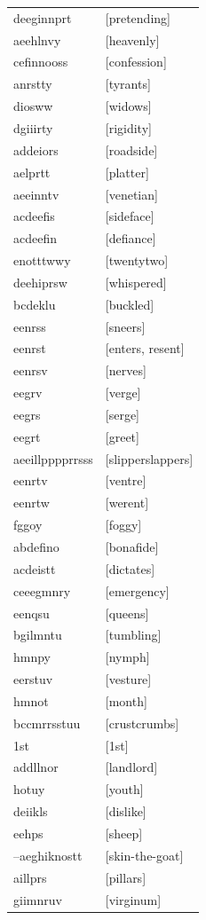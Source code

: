 \documentclass{article}
\begin{document}
\begin{tabular}{ll}
deeginnprt & [pretending] \\
aeehlnvy & [heavenly] \\
cefinnooss & [confession] \\
anrstty & [tyrants] \\
diosww & [widows] \\
dgiiirty & [rigidity] \\
addeiors & [roadside] \\
aelprtt & [platter] \\
aeeinntv & [venetian] \\
acdeefis & [sideface] \\
acdeefin & [defiance] \\
enotttwwy & [twentytwo] \\
deehiprsw & [whispered] \\
bcdeklu & [buckled] \\
eenrss & [sneers] \\
eenrst & [enters, resent] \\
eenrsv & [nerves] \\
eegrv & [verge] \\
eegrs & [serge] \\
eegrt & [greet] \\
aeeillpppprrsss & [slipperslappers] \\
eenrtv & [ventre] \\
eenrtw & [werent] \\
fggoy & [foggy] \\
abdefino & [bonafide] \\
acdeistt & [dictates] \\
ceeegmnry & [emergency] \\
eenqsu & [queens] \\
bgilmntu & [tumbling] \\
hmnpy & [nymph] \\
eerstuv & [vesture] \\
hmnot & [month] \\
bccmrrsstuu & [crustcrumbs] \\
1st & [1st] \\
addllnor & [landlord] \\
hotuy & [youth] \\
deiikls & [dislike] \\
eehps & [sheep] \\
--aeghiknostt & [skin-the-goat] \\
aillprs & [pillars] \\
giimnruv & [virginum] \\

\end{tabular}
\end{document}
